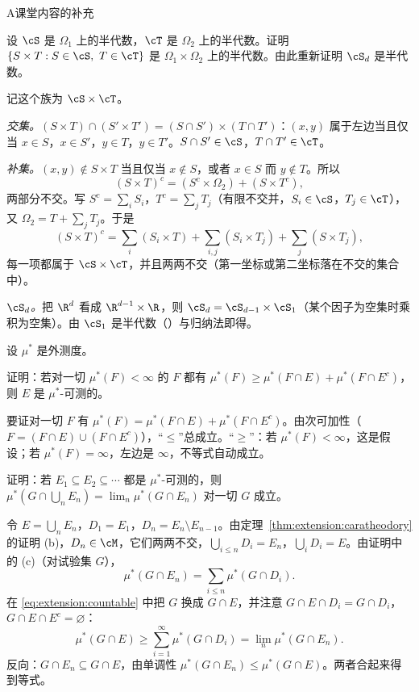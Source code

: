 \begin{exercises}{A}{课堂内容的补充}
\item\label{ex:extension:A1} 设 $\cS$ 是 $\Omega_1$ 上的半代数，$\cT$ 是 $\Omega_2$ 上的半代数。证明 $\{S\times T: S\in\cS,\ T\in\cT\}$ 是 $\Omega_1\times\Omega_2$ 上的半代数。由此重新证明 $\cS_d$ 是半代数。
\begin{solution}
记这个族为 $\cS\times\cT$。

\emph{交集。}$(S\times T)\cap(S'\times T')=(S\cap S')\times(T\cap T')$：$(x,y)$ 属于左边当且仅当 $x\in S$，$x\in S'$，$y\in T$，$y\in T'$。$S\cap S'\in\cS$，$T\cap T'\in\cT$。

\emph{补集。}$(x,y)\notin S\times T$ 当且仅当 $x\notin S$，或者 $x\in S$ 而 $y\notin T$。所以
\[
(S\times T)^c=(S^c\times\Omega_2)+(S\times T^c),
\]
两部分不交。写 $S^c=\sum_iS_i$，$T^c=\sum_jT_j$（有限不交并，$S_i\in\cS$，$T_j\in\cT$），又 $\Omega_2=T+\sum_jT_j$。于是
\[
(S\times T)^c=\sum_i(S_i\times T)+\sum_{i,j}(S_i\times T_j)+\sum_j(S\times T_j),
\]
每一项都属于 $\cS\times\cT$，并且两两不交（第一坐标或第二坐标落在不交的集合中）。

\emph{$\cS_d$。}把 $\R^d$ 看成 $\R^{d-1}\times\R$，则 $\cS_d=\cS_{d-1}\times\cS_1$（某个因子为空集时乘积为空集）。由 $\cS_1$ 是半代数（）与归纳法即得。
\end{solution}

\item\label{ex:extension:A2} 设 $\mu^*$ 是外测度。
\begin{questions}
\item 证明：若对一切 $\mu^*(F)<\infty$ 的 $F$ 都有 $\mu^*(F)\geqslant\mu^*(F\cap E)+\mu^*(F\cap E^c)$，则 $E$ 是 $\mu^*$-可测的。
\begin{solution}
要证对一切 $F$ 有 $\mu^*(F)=\mu^*(F\cap E)+\mu^*(F\cap E^c)$。由次可加性（$F=(F\cap E)\cup(F\cap E^c)$），“$\leqslant$”总成立。“$\geqslant$”：若 $\mu^*(F)<\infty$，这是假设；若 $\mu^*(F)=\infty$，左边是 $\infty$，不等式自动成立。
\end{solution}
\item 证明：若 $E_1\subseteq E_2\subseteq\cdots$ 都是 $\mu^*$-可测的，则 $\mu^*(G\cap\bigcup_nE_n)=\lim_n\mu^*(G\cap E_n)$ 对一切 $G$ 成立。
\begin{solution}
令 $E=\bigcup_nE_n$，$D_1=E_1$，$D_n=E_n\setminus E_{n-1}$。由定理~\ref{thm:extension:caratheodory} 的证明 (b)，$D_n\in\cM$，它们两两不交，$\bigcup_{i\leqslant n}D_i=E_n$，$\bigcup_iD_i=E$。由证明中的 (c)（对试验集 $G$），
\[
\mu^*(G\cap E_n)=\sum_{i\leqslant n}\mu^*(G\cap D_i).
\]
在 \eqref{eq:extension:countable} 中把 $G$ 换成 $G\cap E$，并注意 $G\cap E\cap D_i=G\cap D_i$，$G\cap E\cap E^c=\varnothing$：
\[
\mu^*(G\cap E)\geqslant\sum_{i=1}^\infty\mu^*(G\cap D_i)=\lim_n\mu^*(G\cap E_n).
\]
反向：$G\cap E_n\subseteq G\cap E$，由单调性 $\mu^*(G\cap E_n)\leqslant\mu^*(G\cap E)$。两者合起来得到等式。


\end{solution}
\end{questions}
\end{exercises}
